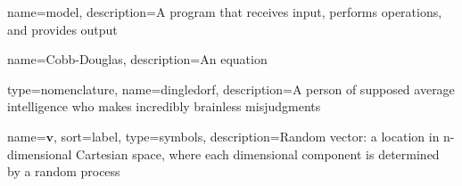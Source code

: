 {
name=model,
description={A program that receives input, performs operations, 
						and provides output}
}

{
name=Cobb-Douglas,
description={An equation}
}

{
type=nomenclature,
name=dingledorf,
description={A person of supposed average intelligence who makes incredibly brainless misjudgments}
}



{
name={$\mathbf{v}$},
sort={label},
type=symbols,
description={Random vector: a location in n-dimensional Cartesian space, where each dimensional component is determined by a random process}
}